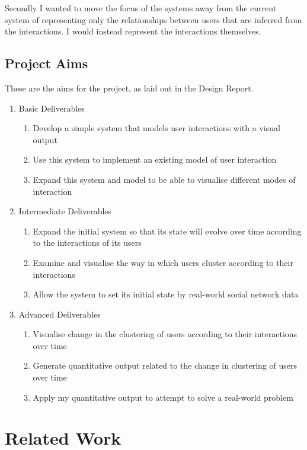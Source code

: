 \documentclass[12pt,a4paper]{article}
\begin{document}
Secondly I wanted to move the focus of the systems away from the current system of representing only the relationships between users that are inferred from the interactions. I would instead represent the interactions themselves.

\subsection{Project Aims}

These are the aims for the project, as laid out in the Design Report.

\begin{enumerate}
\item Basic Deliverables
\begin{enumerate}
\item Develop a simple system that models user interactions with a visual output
\item Use this system to implement an existing model of user interaction
\item Expand this system and model to be able to visualise different modes of interaction
\end{enumerate}
\item Intermediate Deliverables
\begin{enumerate}
\item Expand the initial system so that its state will evolve over time according to the interactions of its users
\item Examine and visualise the way in which users cluster according to their interactions
\item Allow the system to set its initial state by real-world social network data
\end{enumerate}
\item Advanced Deliverables
\begin{enumerate}
\item Visualise change in the clustering of users according to their interactions over time
\item Generate quantitative output related to the change in clustering of users over time
\item Apply my quantitative output to attempt to solve a real-world problem
\end{enumerate}
\end{enumerate}

\section{Related Work}
\end{document}
